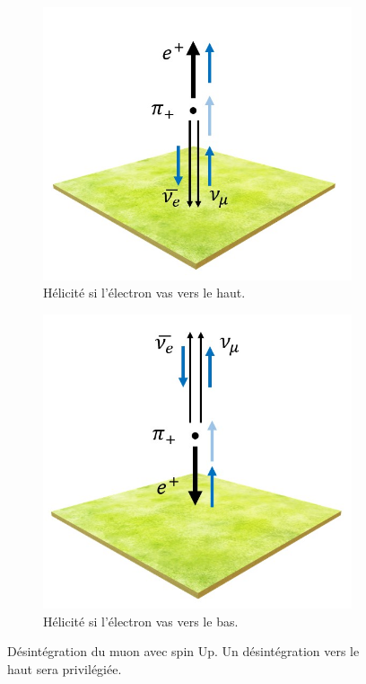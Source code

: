 \documentclass[12pt]{article}
\begin{document}
\begin{figure}[htbp!] 
\centering  
    \begin{subfigure}[t]{.45\textwidth}
    \includegraphics[width=.9\textwidth]{Images/Photos/HeliciteElecUp.jpg}
    \captionsetup{width=0.9\textwidth}
    \caption{Hélicité si l'électron vas vers le haut.}
    \label{fig:HeliciteElecUp}
    \end{subfigure}
    \begin{subfigure}[t]{.45\textwidth}
    \includegraphics[width=.9\textwidth]{Images/Photos/HeliciteElecDown.jpg}
    \captionsetup{width=0.9\textwidth}
    \caption{Hélicité si l'électron vas vers le bas.}
    \label{fig:HeliciteElecDown}
    \end{subfigure}
\caption{Désintégration du muon avec spin Up. Un désintégration vers le haut sera privilégiée.}
\label{HelicitéElecUpDown}
\end{figure}
\end{document}
